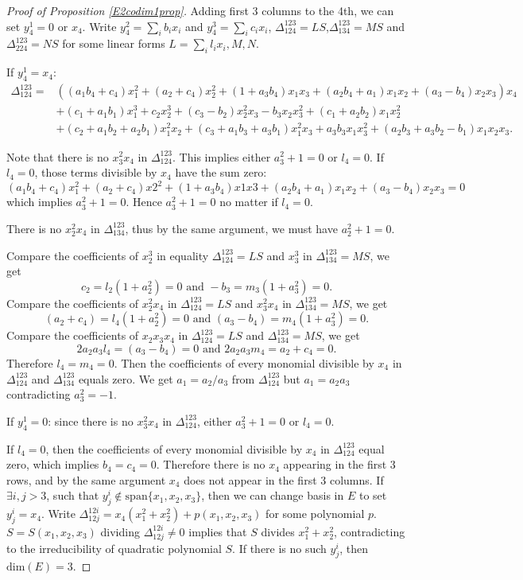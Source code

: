 \documentclass[10pt]{article} %
\theoremstyle{definition}
\begin{document}
\begin{proof}[Proof of Proposition \ref{E2codim1prop}]
Adding first 3 columns to the 4th, we can set $y^1_4=0$ or $x_4$. Write $y^2_4=\sum_i b_ix_i$ and $y^3_4=\sum_i c_ix_i$, $\Delta^{123}_{124}=LS$,$\Delta^{123}_{134}=MS$ and $\Delta^{123}_{224}=NS$ for some linear forms $L=\sum_i l_ix_i,M,N$.

If $y^1_4=x_4$: 
\begin{align*}
    \Delta^{123}_{124}=&((a_1b_4+c_4)x_1^2 + (a_2+c_4)x_2^2 +(1+a_3b_4)x_1x_3 + (a_2b_4+a_1)x_1x_2 + (a_3-b_4)x_2x_3)x_4 \\
    &+(c_1+a_1b_1)x_1^3+ c_2x_2^3 + (c_3-b_2)x_2^2x_3 - b_3x_2x_3^2 + (c_1+a_2b_2)x_1x_2^2\\
    &+ (c_2+a_1b_2+a_2b_1)x_1^2x_2 + (c_3+a_1b_3+a_3b_1)x_1^2x_3 + a_3b_3x_1x_3^2 +(a_2b_3+a_3b_2-b_1)x_1x_2x_3.
\end{align*}

Note that there is no $x_3^2x_4$ in $\Delta^{123}_{124}$. This implies either $a_3^2+1=0$ or $l_4=0$. If $l_4=0$, those terms divisible by $x_4$ have the sum zero: 
$$(a_1b_4+c_4)x_1^2 + (a_2+c_4)x2^2 +(1+a_3b_4)x1x3 + (a_2b_4+a_1)x_1x_2 + (a_3-b_4)x_2x_3=0$$
which implies $a_3^2+1=0$. Hence $a_3^2+1=0$ no matter if $l_4=0$.

There is no $x_2^2x_4$ in $\Delta^{123}_{134}$, thus by the same argument, we must have $a_2^2+1=0$. 

Compare the coefficients of $x_2^3$ in equality $\Delta^{123}_{124}=LS$ and $x_3^3$ in $\Delta^{123}_{134}=MS$, we get 
$$c_2=l_2(1+a_2^2)=0\text{ and }-b_3=m_3(1+a_3^2)=0.$$ 
Compare the coefficients of $x_2^2x_4$ in $\Delta^{123}_{124}=LS$ and $x_3^2x_4$ in $\Delta^{123}_{134}=MS$, we get $$(a_2+c_4)=l_4(1+a_2^2)=0 \text{ and } (a_3-b_4)=m_4(1+a_3^2)=0.$$
Compare the coefficients of $x_2x_3x_4$ in $\Delta^{123}_{124}=LS$ and $\Delta^{123}_{134}=MS$, we get
$$2a_2a_3l_4=(a_3-b_4)=0\text{ and }2a_2a_3m_4=a_2+c_4=0.$$
Therefore $l_4=m_4=0$. Then the coefficients of every monomial divisible by $x_4$ in $\Delta^{123}_{124}$ and $\Delta^{123}_{134}$ equals zero. We get $a_1=a_2/a_3$ from $\Delta^{123}_{124}$ but $a_1=a_2a_3$ contradicting $a_3^2=-1$.

If $y^1_4=0$: since there is no $x_3^2x_4$ in $\Delta^{123}_{124}$, either $a_3^2+1=0$ or $l_4=0$. 

If $l_4=0$, then the coefficients of every monomial divisible by $x_4$ in $\Delta^{123}_{124}$ equal zero, which implies $b_4=c_4=0$. Therefore there is no $x_4$ appearing in the first 3 rows, and by the same argument $x_4$ does not appear in the first 3 columns. If $\exists i,j>3$, such that $y^i_j\notin\mathrm{span}\{x_1,x_2,x_3\}$, then we can change basis in $E$ to set $y^i_j=x_4$. Write $\Delta^{12i}_{12j}=x_4(x_1^2+x_2^2)+p(x_1,x_2,x_3)$ for some polynomial $p$. $S=S(x_1,x_2,x_3)$ dividing $\Delta^{12i}_{12j}\neq 0$ implies that $S$ divides $x_1^2+x_2^2$, contradicting to the irreducibility of quadratic polynomial $S$. If there is no such $y^i_j$, then $\mathrm{dim}(E)=3$.


\end{proof}
\end{document}
